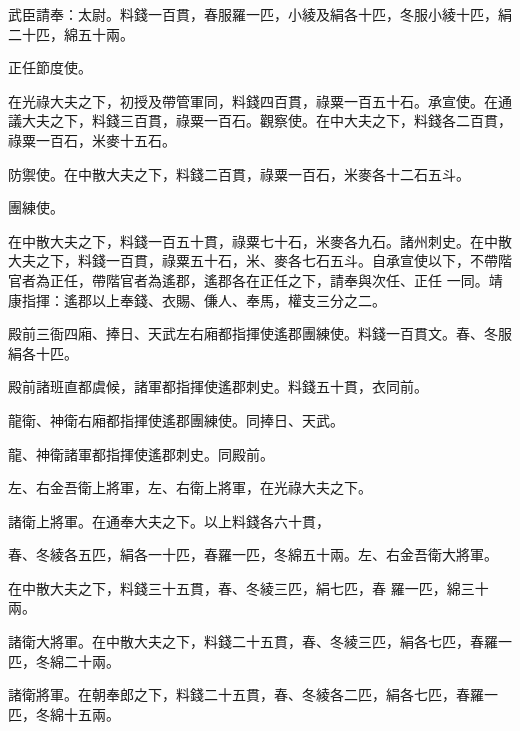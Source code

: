 \begin{pinyinscope}
 武臣請奉：太尉。料錢一百貫，春服羅一匹，小綾及絹各十匹，冬服小綾十匹，絹二十匹，綿五十兩。



 正任節度使。



 在光祿大夫之下，初授及帶管軍同，料錢四百貫，祿粟一百五十石。承宣使。在通議大夫之下，料錢三百貫，祿粟一百石。觀察使。在中大夫之下，料錢各二百貫，祿粟一百石，米麥十五石。



 防禦使。在中散大夫之下，料錢二百貫，祿粟一百石，米麥各十二石五斗。



 團練使。



 在中散大夫之下，料錢一百五十貫，祿粟七十石，米麥各九石。諸州刺史。在中散大夫之下，料錢一百貫，祿粟五十石，米、麥各七石五斗。自承宣使以下，不帶階官者為正任，帶階官者為遙郡，遙郡各在正任之下，請奉與次任、正任
 一同。靖康指揮：遙郡以上奉錢、衣賜、傔人、奉馬，權支三分之二。



 殿前三衙四廂、捧日、天武左右廂都指揮使遙郡團練使。料錢一百貫文。春、冬服絹各十匹。



 殿前諸班直都虞候，諸軍都指揮使遙郡刺史。料錢五十貫，衣同前。



 龍衛、神衛右廂都指揮使遙郡團練使。同捧日、天武。



 龍、神衛諸軍都指揮使遙郡刺史。同殿前。



 左、右金吾衛上將軍，左、右衛上將軍，在光祿大夫之下。



 諸衛上將軍。在通奉大夫之下。以上料錢各六十貫，



 春、冬綾各五匹，絹各一十匹，春羅一匹，冬綿五十兩。左、右金吾衛大將軍。



 在中散大夫之下，料錢三十五貫，春、冬綾三匹，絹七匹，春
 羅一匹，綿三十兩。



 諸衛大將軍。在中散大夫之下，料錢二十五貫，春、冬綾三匹，絹各七匹，春羅一匹，冬綿二十兩。



 諸衛將軍。在朝奉郎之下，料錢二十五貫，春、冬綾各二匹，絹各七匹，春羅一匹，冬綿十五兩。




\end{pinyinscope}
